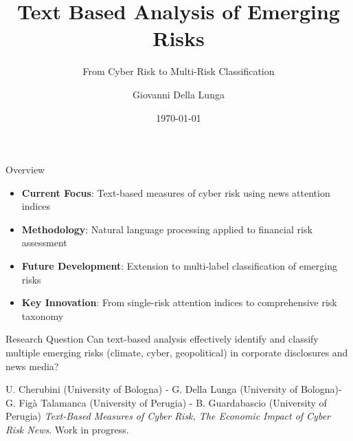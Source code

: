 \documentclass[aspectratio=169]{beamer}
\title{Text Based Analysis of Emerging Risks}
\subtitle{From Cyber Risk to Multi-Risk Classification}
\author{Giovanni Della Lunga}
\institute{University of Bologna}
\date{\today}
\begin{document}
\frame{\titlepage}
%
%
\begin{frame}{Overview}
\begin{itemize}
    \item \textbf{Current Focus}: Text-based measures of cyber risk using news attention indices
    \item \textbf{Methodology}: Natural language processing applied to financial risk assessment
    \item \textbf{Future Development}: Extension to multi-label classification of emerging risks
    \item \textbf{Key Innovation}: From single-risk attention indices to comprehensive risk taxonomy
\end{itemize}

\vspace{0.5cm}
\begin{block}{Research Question}
Can text-based analysis effectively identify and classify multiple emerging risks (climate, cyber, geopolitical) in corporate disclosures and news media?
\end{block}
\vspace{0.2cm}
\small
U. Cherubini (University of Bologna) - G. Della Lunga (University of Bologna)- G. Figà Talamanca (University of Perugia) - B. Guardabascio (University of Perugia) \textit{Text-Based Measures of Cyber Risk, The Economic Impact of Cyber Risk News}. Work in progress.

\end{frame}
%
%
\end{document}
